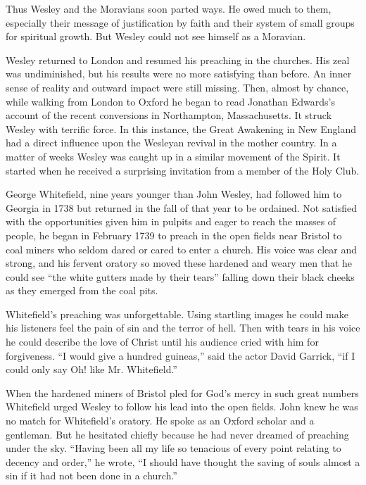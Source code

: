 Thus Wesley and the Moravians soon parted ways. He owed much to them, especially their message of
justification by faith and their system of small groups for spiritual growth. But Wesley could not
see himself as a Moravian.

Wesley returned to London and resumed his preaching in the churches. His zeal was undiminished, but
his results were no more satisfying than before. An inner sense of reality and outward impact were
still missing. Then, almost by chance, while walking from London to Oxford he began to read Jonathan
Edwards’s account of the recent conversions in Northampton, Massachusetts. It struck Wesley with
terrific force. In this instance, the Great Awakening in New England had a direct influence upon the
Wesleyan revival in the mother country. In a matter of weeks Wesley was caught up in a similar
movement of the Spirit. It started when he received a surprising invitation from a member of the
Holy Club.

George Whitefield, nine years younger than John Wesley, had followed him to Georgia in 1738 but
returned in the fall of that year to be ordained. Not satisfied with the opportunities given him in
pulpits and eager to reach the masses of people, he began in February 1739 to preach in the open
fields near Bristol to coal miners who seldom dared or cared to enter a church. His voice was clear
and strong, and his fervent oratory so moved these hardened and weary men that he could see “the
white gutters made by their tears” falling down their black cheeks as they emerged from the coal
pits.

Whitefield’s preaching was unforgettable. Using startling images he could make his listeners feel
the pain of sin and the terror of hell. Then with tears in his voice he could describe the love of
Christ until his audience cried with him for forgiveness. “I would give a hundred guineas,” said the
actor David Garrick, “if I could only say Oh! like Mr. Whitefield.”

When the hardened miners of Bristol pled for God’s mercy in such great numbers Whitefield urged
Wesley to follow his lead into the open fields. John knew he was no match for Whitefield’s oratory.
He spoke as an Oxford scholar and a gentleman. But he hesitated chiefly because he had never dreamed
of preaching under the sky. “Having been all my life so tenacious of every point relating to decency
and order,” he wrote, “I should have thought the saving of souls almost a sin if it had not been
done in a church.”

